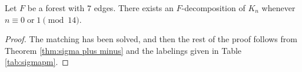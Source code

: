 

\begin{thm}\label{thm:0 or 1 mod 14}
    Let $F$ be a forest with $7$ edges. There exists an $F$-decomposition of $K_n$ whenever $n \equiv 0 \; \textrm{or} \; 1 \pmod{14}.$
\end{thm}
\begin{proof}
    The matching has been solved, and then the rest of the proof follows from Theorem \ref{thm:sigma plus minus} and the labelings given in Table \ref{tab:sigmapm}.
\end{proof}
